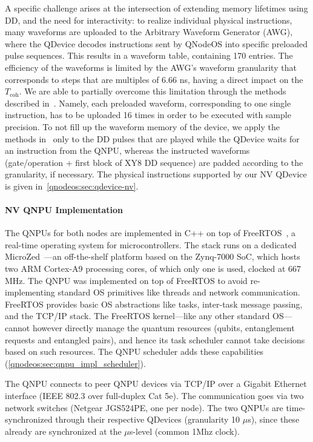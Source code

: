A specific challenge arises at the intersection of extending memory lifetimes using DD, and the need for interactivity: to realize individual physical instructions, many waveforms are uploaded to the Arbitrary Waveform Generator (AWG), where the QDevice decodes instructions sent by QNodeOS into specific preloaded pulse sequences.
This results in a waveform table, containing 170 entries.
The efficiency of the waveforms is limited by the AWG's waveform granularity that corresponds to steps that are multiples of 6.66 ns, having a direct impact on the $T_{\text{coh}}$.
We are able to partially overcome this limitation through the methods described in~\cite{corna_efficient_2021}.
Namely, each preloaded waveform, corresponding to one single instruction, has to be uploaded 16 times in order to be executed with sample precision.
To not fill up the waveform memory of the device, we apply the methods in~\cite{corna_efficient_2021} only to the DD pulses that are played while the QDevice waits for an instruction from the QNPU, whereas the instructed waveforms (gate/operation + first block of XY8 DD sequence) are padded according to the granularity, if necessary.
The physical instructions supported by our NV QDevice is given in~\cref{qnodeos:sec:qdevice-nv}.

\paragraph{NV QNPU Implementation}

The QNPUs for both nodes are implemented in C++ on top of FreeRTOS~\cite{freertos}, a real-time operating system for microcontrollers.
The stack runs on a dedicated MicroZed~\cite{microzed}---an off-the-shelf platform based on the Zynq-7000 SoC, which hosts two ARM Cortex-A9 processing cores, of which only one is used, clocked at 667 MHz.
The QNPU was implemented on top of FreeRTOS to avoid re-implementing standard OS primitives like threads and network communication.
FreeRTOS provides basic OS abstractions like tasks, inter-task message passing, and the TCP/IP stack.
The FreeRTOS kernel---like any other standard OS---cannot however directly manage the quantum resources (qubits, entanglement requests and entangled pairs), and hence its task scheduler cannot take decisions based on such resources.
The QNPU scheduler adds these capabilities (\cref{qnodeos:sec:qnpu_impl_scheduler}).

The QNPU connects to peer QNPU devices via TCP/IP over a Gigabit Ethernet interface (IEEE 802.3 over full-duplex Cat 5e).
The communication goes via two network switches (Netgear JGS524PE, one per node).
The two QNPUs are time-synchronized through their respective QDevices (granularity 10 $\mu$s), since these already are synchronized at the $\mu$s-level (common 1Mhz clock).

